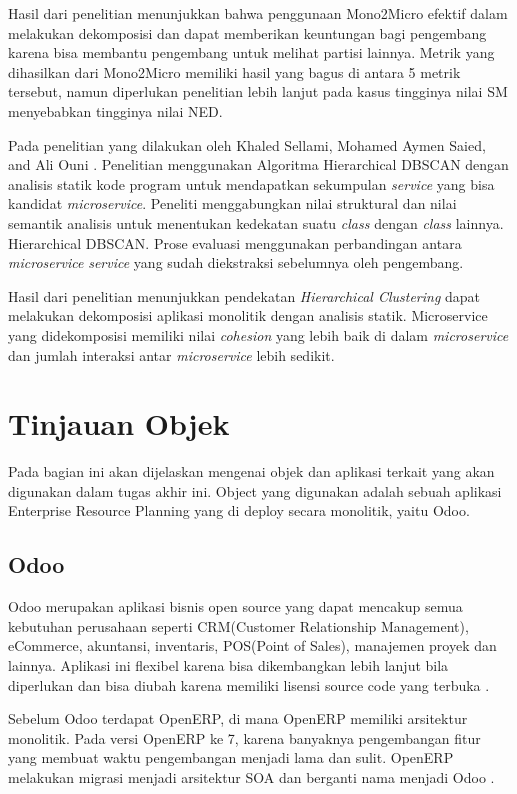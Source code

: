 Hasil dari penelitian menunjukkan bahwa penggunaan Mono2Micro efektif dalam melakukan dekomposisi dan dapat memberikan keuntungan bagi pengembang karena bisa membantu pengembang untuk melihat partisi lainnya. Metrik yang dihasilkan dari Mono2Micro memiliki hasil yang bagus di antara 5 metrik tersebut, namun diperlukan penelitian lebih lanjut pada kasus tingginya nilai SM menyebabkan tingginya nilai NED.

Pada penelitian yang dilakukan oleh Khaled Sellami, Mohamed Aymen Saied, and Ali Ouni \cite{ECD}. Penelitian menggunakan Algoritma Hierarchical DBSCAN dengan analisis statik kode program untuk mendapatkan sekumpulan \textit{service} yang bisa kandidat \textit{microservice}.  Peneliti menggabungkan nilai struktural dan nilai semantik analisis untuk menentukan kedekatan suatu \textit{class} dengan \textit{class} lainnya.
Hierarchical DBSCAN. Prose evaluasi menggunakan perbandingan antara \textit{microservice} \textit{service} yang sudah diekstraksi sebelumnya oleh pengembang. 

Hasil dari penelitian menunjukkan pendekatan \textit{Hierarchical Clustering} dapat melakukan dekomposisi aplikasi monolitik dengan analisis statik. Microservice yang didekomposisi memiliki nilai \textit{cohesion} yang lebih baik di dalam \textit{microservice} dan  jumlah interaksi antar \textit{microservice} lebih sedikit.
\\

\section{Tinjauan Objek}
Pada bagian ini akan dijelaskan mengenai objek dan aplikasi terkait yang akan digunakan dalam tugas akhir ini. Object yang digunakan adalah sebuah aplikasi Enterprise Resource Planning yang di deploy secara monolitik, yaitu Odoo.

\subsection{Odoo}
Odoo merupakan aplikasi bisnis open source yang dapat mencakup semua kebutuhan perusahaan seperti CRM(Customer Relationship Management), eCommerce, akuntansi, inventaris, POS(Point of Sales), manajemen proyek dan lainnya. Aplikasi ini flexibel karena bisa dikembangkan lebih lanjut bila diperlukan dan bisa diubah karena memiliki lisensi source code yang terbuka \cite{odoo}. 

Sebelum Odoo terdapat OpenERP, di mana OpenERP memiliki arsitektur monolitik. Pada versi OpenERP ke 7, karena banyaknya pengembangan fitur yang membuat waktu pengembangan menjadi lama dan sulit. OpenERP melakukan migrasi menjadi arsitektur SOA dan berganti nama menjadi Odoo \cite{5FA}.

